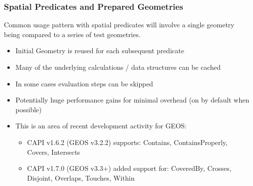 \documentclass[slidestop,mathserif]{beamer}
\begin{document}

\begin{frame}
\frametitle{Spatial Predicates and Prepared Geometries}

Common usage pattern with spatial predicates will involve a single geometry being compared to a series of test geometries.
\begin{itemize}
\item Initial Geometry is reused for each subsequent predicate
\item Many of the underlying calculations / data structures can be cached
\item In some cases evaluation steps can be skipped
\item Potentially huge performance gains for minimal overhead (on by default when possible)
\item This is an area of recent development activity for GEOS:
\begin{itemize}
\item CAPI v1.6.2 (GEOS v3.2.2) supports: Contains, ContainsProperly, Covers, Intersects
\item CAPI v1.7.0 (GEOS v3.3+) added support for: CoveredBy, Crosses, Disjoint, Overlaps, Touches, Within
\end{itemize}
\end{itemize}

\end{frame}

\end{document}

